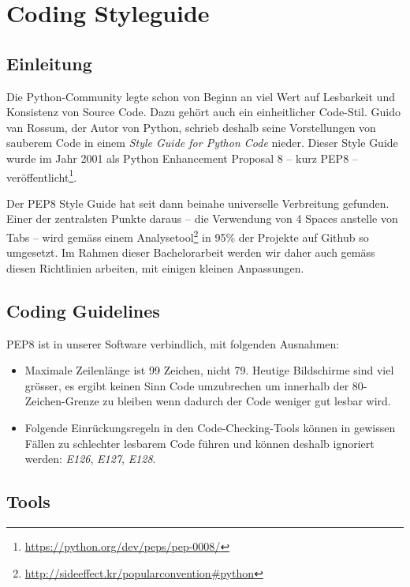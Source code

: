 \documentclass{article}
\begin{document}
\section{Coding Styleguide}

\subsection{Einleitung}

Die Python-Community legte schon von Beginn an viel Wert auf Lesbarkeit und
Konsistenz von Source Code. Dazu gehört auch ein einheitlicher Code-Stil.  Guido
van Rossum, der Autor von Python, schrieb deshalb seine Vorstellungen von
sauberem Code in einem \textit{Style Guide for Python Code} nieder. Dieser Style
Guide wurde im Jahr 2001 als Python Enhancement Proposal 8 -- kurz PEP8 --
veröffentlicht\footnote{\url{https://python.org/dev/peps/pep-0008/}}.

Der PEP8 Style Guide hat seit dann beinahe universelle Verbreitung gefunden.
Einer der zentralsten Punkte daraus -- die Verwendung von 4 Spaces anstelle von
Tabs -- wird gemäss einem
Analysetool\footnote{\url{http://sideeffect.kr/popularconvention#python}} in
95\% der Projekte auf Github so umgesetzt. Im Rahmen dieser Bachelorarbeit
werden wir daher auch gemäss diesen Richtlinien arbeiten, mit einigen kleinen
Anpassungen.

\subsection{Coding Guidelines}

PEP8 ist in unserer Software verbindlich, mit folgenden Ausnahmen:

\begin{itemize}
	\item Maximale Zeilenlänge ist 99 Zeichen, nicht 79. Heutige Bildschirme sind
		viel grösser, es ergibt keinen Sinn Code umzubrechen um innerhalb der
		80-Zeichen-Grenze zu bleiben wenn dadurch der Code weniger gut lesbar wird.
	\item Folgende Einrückungsregeln in den Code-Checking-Tools können in gewissen
		Fällen zu schlechter lesbarem Code führen und können deshalb ignoriert
		werden: \textit{E126}, \textit{E127}, \textit{E128}.
\end{itemize}

\subsection{Tools}
\end{document}
